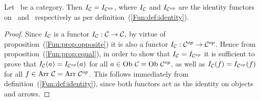 \begin{prop}\label{Fun:prop:identity:opposite}
    Let \Cat\ be a category. Then $I_{\cal C}=I_{{\cal C}^{op}}$, where 
    $I_{\cal C}$ and $I_{{\cal C}^{op}}$ are the identity functors on \Cat\ and
    \Cop\ respectively as per definition~(\ref{Fun:def:identity}).
\end{prop}
\begin{proof}
    Since $I_{\cal C}$ is a functor $I_{\cal C}:\mbox{$\cal C$}\to\mbox{$\cal C$}$, by virtue of 
    proposition~(\ref{Fun:prop:opposite}) it is also a functor 
    $I_{\cal C}:\mbox{${\cal C}^{op}$}\to\mbox{${\cal C}^{op}$}$. Hence from proposition~(\ref{Fun:prop:equal}),
    in order to show that $I_{\cal C}=I_{{\cal C}^{op}}$ it is sufficient
    to prove that $I_{\cal C}(a)=I_{{\cal C}^{op}}(a)$ for all $a\in\mbox{\rm Ob}\ \mbox{$\cal C$}
    =\mbox{\rm Ob}\ \mbox{${\cal C}^{op}$}$, as well as $I_{\cal C}(f)=I_{{\cal C}^{op}}(f)$ for all
    $f\in\mbox{\rm Arr}\ \mbox{$\cal C$}=\mbox{\rm Arr}\ \mbox{${\cal C}^{op}$}$. This follows immediately from 
    definition~(\ref{Fun:def:identity}), since both functors act as the 
    identity on objects and arrows.
\end{proof}
